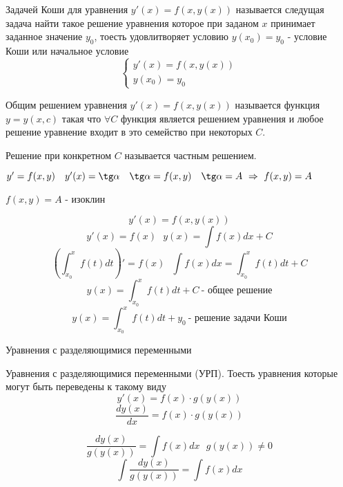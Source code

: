 \begin{define}
  Задачей Коши для уравнения $y'(x) = f(x, y(x))$ называется следущая задача
  найти такое решение уравнения которое при заданом $x$ принимает
  заданное значение $y_0$, тоесть удовлитворяет условию $y(x_0) = y_0$
  - условие Коши или начальное условие
  $$
  \left\{
  \begin{array}{l}
    y'(x) = f(x, y(x)) \\
    y(x_0) = y_0
  \end{array}
  \right.
  $$
\end{define}

\begin{define}
  Общим решением уравнения $y'(x) = f(x, y(x))$ называется функция $y = y(x,c)$
  такая что $\forall C$ функция является решением уравнения и любое
  решение уравнение входит в это семейство при некоторых $C$.

  Решение при конкретном $C$ называется частным решением.
\end{define}

\begin{define}[изоклина]
  $y' = f(x,y) ~~~ y'(x) = \tg \alpha ~~~ \tg \alpha = f(x,y) ~~~
  \tg \alpha = A ~ \Rightarrow ~ f(x,y) = A$

  $f(x, y) = A$ - изоклин
\end{define}

\begin{define}
  $$
  y'(x) = f(x, y(x))
  $$
  $$
  y'(x) = f(x) ~~~ y(x) = \int f(x)dx + C
  $$
  $$
  \left( \int_{x_0}^x f(t) dt \right)' = f(x) ~~~ \int f(x)dx = \int_{x_0}^x
  f(t)dt + C
  $$
  $$
  y(x) = \int_{x_0}^x f(t)dt + C ~ \text{- общее решение}
  $$
  $$
  y(x) = \int_{x_0}^x f(t)dt + y_0 ~ \text{- решение задачи Коши}
  $$
\end{define}

\begin{title}[\Large]
  Уравнения с разделяющимися переменными
\end{title}

\begin{define}
  Уравнения с разделяющимися переменными (УРП). Тоесть уравнения которые
  могут быть переведены к такому виду
  $$
  y'(x) = f(x) \cdot g(y(x))
  $$
  $$
  \frac{dy(x)}{dx} = f(x) \cdot g(y(x))
  $$
\end{define}

\begin{block}
  $$
  \frac{dy(x)}{g(y(x))} = \int f(x)dx ~~~ g(y(x)) \not= 0
  $$
  $$
  \int \frac{dy(x)}{g(y(x))} = \int f(x)dx
  $$
\end{block}

